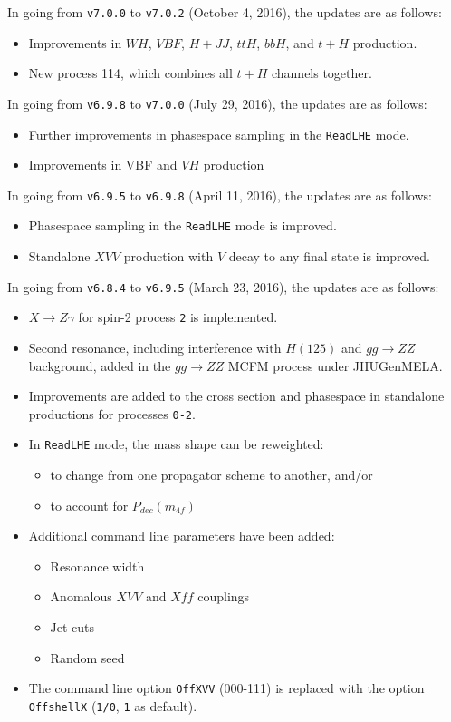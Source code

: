 \documentclass[aps,superscriptaddress,nofootinbib]{revtex4}
\begin{document}
\noindent
In going from \verb|v7.0.0| to \verb|v7.0.2| (October 4, 2016), the updates are as follows:
\begin{itemize}
\item Improvements in $WH$, $VBF$, $H+JJ$, $ttH$, $bbH$, and $t+H$ production.
\item New process 114, which combines all $t+H$ channels together.
\end{itemize}
\noindent
In going from \verb|v6.9.8| to \verb|v7.0.0| (July 29, 2016), the updates are as follows:
\begin{itemize}
\item Further improvements in phasespace sampling in the \verb|ReadLHE| mode.
\item Improvements in VBF and $VH$ production
\end{itemize}
\noindent
In going from \verb|v6.9.5| to \verb|v6.9.8| (April 11, 2016), the updates are as follows:
\begin{itemize}
\item Phasespace sampling in the \verb|ReadLHE| mode is improved.
\item Standalone $XVV$ production with $V$ decay to any final state is improved.
\end{itemize}
\noindent
In going from \verb|v6.8.4| to \verb|v6.9.5| (March 23, 2016), the updates are as follows:
\begin{itemize}
\item $X\to Z\gamma$ for spin-2 process \verb|2| is implemented.
\item Second resonance, including interference with $H(125)$ and $gg\to ZZ$ background, added in the $gg\to ZZ$ MCFM process under JHUGenMELA.
\item Improvements are added to the cross section and phasespace in standalone productions for processes \verb|0-2|.
\item In \verb|ReadLHE| mode, the mass shape can be reweighted:
\begin{itemize}
\item to change from one propagator scheme to another, and/or
\item to account for $P_{dec}(m_{4f})$
\end{itemize}
\item Additional command line parameters have been added:
\begin{itemize}
\item Resonance width
\item Anomalous $XVV$ and $Xff$ couplings
\item Jet cuts
\item Random seed
\end{itemize}
\item The command line option \verb|OffXVV| (000-111) is replaced with the option \verb|OffshellX| (\verb|1/0|, \verb|1| as default).
\end{itemize}
\end{document}
